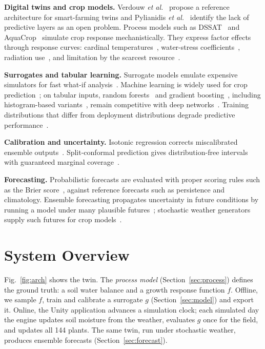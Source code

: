 \documentclass[conference]{IEEEtran}
\begin{document}
\textbf{Digital twins and crop models.} Verdouw \emph{et al.}~\cite{verdouw2021digital} propose a
reference architecture for smart-farming twins and Pylianidis
\emph{et al.}~\cite{pylianidis2021introducing} identify the lack of predictive layers as an open
problem. Process models such as DSSAT~\cite{jones2003dssat} and AquaCrop~\cite{steduto2009aquacrop}
simulate crop response mechanistically. They express factor effects through response curves:
cardinal temperatures~\cite{yan1999equation}, water-stress coefficients~\cite{allen1998crop},
radiation use~\cite{monteith1977climate}, and limitation by the scarcest
resource~\cite{paris1992von}.

\textbf{Surrogates and tabular learning.} Surrogate models emulate expensive simulators for
fast what-if analysis~\cite{razavi2012review}. Machine learning is widely used for crop
prediction~\cite{liakos2018machine,kamilaris2018deep}; on tabular inputs, random
forests~\cite{breiman2001random} and gradient boosting~\cite{friedman2001greedy}, including
histogram-based variants~\cite{ke2017lightgbm}, remain competitive with deep
networks~\cite{grinsztajn2022tree}. Training distributions that differ from deployment
distributions degrade predictive performance~\cite{quinonero2009dataset}.

\textbf{Calibration and uncertainty.} Isotonic regression corrects miscalibrated ensemble
outputs~\cite{zadrozny2002transforming,niculescu2005predicting}. Split-conformal prediction
gives distribution-free intervals with guaranteed marginal coverage~\cite{vovk2005algorithmic,
angelopoulos2023conformal}.

\textbf{Forecasting.} Probabilistic forecasts are evaluated with proper scoring rules such as the
Brier score~\cite{brier1950verification,gneiting2007strictly}, against reference forecasts such as
persistence and climatology. Ensemble forecasting propagates uncertainty in future conditions by
running a model under many plausible futures~\cite{leutbecher2008ensemble}; stochastic weather
generators supply such futures for crop models~\cite{richardson1981stochastic}.

\section{System Overview}

Fig.~\ref{fig:arch} shows the twin. The \emph{process model} (Section~\ref{sec:process}) defines
the ground truth: a soil water balance and a growth response function $f$. Offline, we sample
$f$, train and calibrate a surrogate $g$ (Section~\ref{sec:model}) and export it. Online, the
Unity application advances a simulation clock; each simulated day the engine updates soil
moisture from the weather, evaluates $g$ once for the field, and updates all 144 plants. The same
twin, run under stochastic weather, produces ensemble forecasts (Section~\ref{sec:forecast}).
\end{document}
